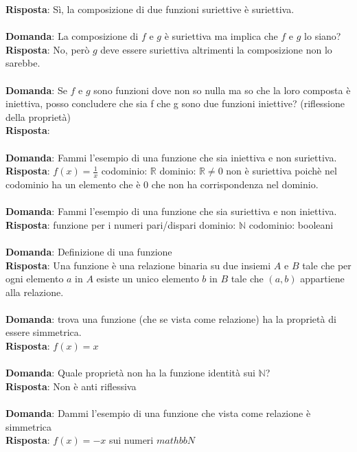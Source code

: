 \documentclass{article}
\begin{document}
\textbf{Risposta}: Sì, la composizione di due funzioni suriettive è suriettiva. \\ \\
\textbf{Domanda}: La composizione di $f$ e $g$ è suriettiva ma implica che $f$ e $g$ lo siano? \\
\textbf{Risposta}: No, però $g$ deve essere suriettiva altrimenti la composizione non lo sarebbe. \\ \\
\textbf{Domanda}: Se $f$ e $g$ sono funzioni dove non so nulla ma so che la loro composta è iniettiva, posso concludere che sia f che g sono due funzioni iniettive? (riflessione della proprietà)\\
\textbf{Risposta}: \\ \\
\textbf{Domanda}: Fammi l'esempio di una funzione che sia iniettiva e non suriettiva. \\
\textbf{Risposta}: $f(x) = \frac{1}{x}$ codominio: $\mathbb{R}$ dominio: $\mathbb{R} \neq 0$ non è suriettiva poichè nel codominio ha un elemento che è 0 che non ha corrispondenza nel dominio.\\ \\
\textbf{Domanda}: Fammi l'esempio di una funzione che sia suriettiva e non iniettiva. \\
\textbf{Risposta}: funzione per i numeri pari/dispari dominio: $\mathbb{N}$ codominio: booleani \\ \\
\textbf{Domanda}: Definizione di una funzione \\
\textbf{Risposta}: Una funzione è una relazione binaria su due insiemi $A$ e $B$ tale che per ogni elemento $a$ in $A$ esiste un unico elemento $b$ in $B$ tale che $(a,b)$ appartiene alla relazione. \\ \\
\textbf{Domanda}: trova una funzione (che se vista come relazione) ha la proprietà di essere simmetrica. \\
\textbf{Risposta}: $f(x)=x$ \\ \\
\textbf{Domanda}: Quale proprietà non ha la funzione identità sui $\mathbb{N}$? \\
\textbf{Risposta}: Non è anti riflessiva \\ \\
\textbf{Domanda}: Dammi l'esempio di una funzione che vista come relazione è simmetrica \\
\textbf{Risposta}: $f(x) = -x$ sui numeri $mathbb{N}$\\ \\
\end{document}
